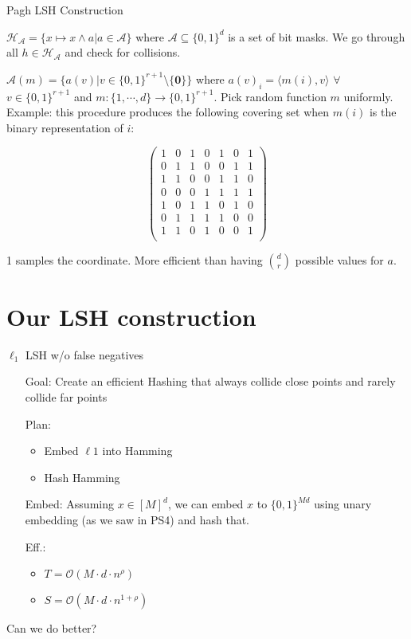 \documentclass[xcolor=svgnames]{beamer}
\newcommand{\zo}{\{0,1\}}
\newcommand{\BO}{{\mathcal{O}}}
\begin{document}
\begin{frame}{Pagh LSH Construction}

\small{
$\mathcal{H}_{\mathcal{A}} = \{x \mapsto x \wedge a | a \in \mathcal{A}\}$ where $\mathcal{A} \subseteq \{0,1\}^d$ is a set of bit masks. We go through all $h \in \mathcal{H}_{\mathcal{A}}$ and check for collisions.

$\mathcal{A}(m) = \{a(v) | v \in \{0,1\}^{r+1} \setminus \{\mathbf{0}\}\}$ where $a(v)_i = \langle m(i),v \rangle$ $\forall$ $v \in \{0,1\}^{r+1}$ and $m : \{1,\cdots,d\} \rightarrow \{0,1\}^{r+1}$.\newline
Pick random function $m$ uniformly.\newline
Example: this procedure produces the following covering set when $m(i)$ is the binary representation of $i$:
}

\[ \left( \begin{array}{ccccccc}
1 & 0 & 1 & 0 & 1 & 0 & 1 \\
0 & 1 & 1 & 0 & 0 & 1 & 1 \\
1 & 1 & 0 & 0 & 1 & 1 & 0 \\
0 & 0 & 0 & 1 & 1 & 1 & 1 \\
1 & 0 & 1 & 1 & 0 & 1 & 0 \\
0 & 1 & 1 & 1 & 1 & 0 & 0 \\
1 & 1 & 0 & 1 & 0 & 0 & 1 \\
\end{array} \right)\] 

\small{1 samples the coordinate. More efficient than having ${d \choose r}$ possible values for $a$.}

\end{frame}

\section{Our LSH construction}

\begin{frame}{$\ell_1$ LSH w/o false negatives}
\pause
\begin{enumerate}
\item[Goal:] Create an efficient Hashing that always collide close points and rarely collide far points
\pause
\item[Plan:] 
\begin{itemize}
\item Embed $\ell1$ into Hamming 
\item Hash Hamming
\end{itemize} 
\pause
\item[Embed:] Assuming $x \in [M]^d$, we can embed $x$ to $\zo^{Md}$ using unary embedding (as we saw in PS4) and hash that.
\pause
\item[Eff.:] 
\begin{itemize}
\item $T = \BO(M \cdot d \cdot n^\rho)$ 
\item $S = \BO(M \cdot d \cdot n^{1+\rho})$ 
\end{itemize} 
\end{enumerate}
\pause
\centering
{\Large Can we do better?}
\end{frame}
\end{document}
